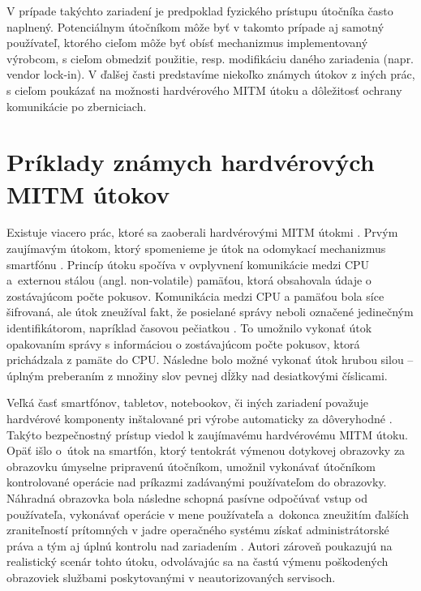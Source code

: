 V prípade takýchto zariadení je predpoklad fyzického prístupu útočníka často naplnený. Potenciálnym útočníkom môže byť v takomto prípade aj samotný používateľ, ktorého cieľom môže byť obísť mechanizmus implementovaný výrobcom, s cieľom obmedziť použitie, resp. modifikáciu daného zariadenia (napr. vendor lock-in). V ďalšej časti predstavíme niekoľko známych útokov z iných prác, s cieľom poukázať na možnosti hardvérového MITM útoku a dôležitosť ochrany komunikácie po zberniciach.

\section{Príklady známych hardvérových MITM útokov}
Existuje viacero prác, ktoré sa zaoberali hardvérovými MITM útokmi \cite{mitmI2C, mitmSmartphone, mitmBitlocker, mitmTouch, mitmTPM}. Prvým zaujímavým útokom, ktorý spomenieme je útok na odomykací mechanizmus smartfónu \cite{mitmSmartphone}. Princíp útoku spočíva v ovplyvnení komunikácie medzi CPU a~externou stálou (angl. non-volatile) pamäťou, ktorá obsahovala údaje o zostávajúcom počte pokusov. Komunikácia medzi CPU a pamäťou bola síce šifrovaná, ale útok zneužíval fakt, že posielané správy neboli označené jedinečným identifikátorom, napríklad časovou pečiatkou \cite{mitmSmartphone}. To umožnilo vykonať útok opakovaním správy s informáciou o zostávajúcom počte pokusov, ktorá prichádzala z pamäte do CPU. Následne bolo možné vykonať útok hrubou silou -- úplným preberaním z množiny slov pevnej dĺžky nad desiatkovými číslicami.

Veľká časť smartfónov, tabletov, notebookov, či iných zariadení považuje hardvérové komponenty inštalované pri výrobe automaticky za dôveryhodné \cite{mitmTouch}. Takýto bezpečnostný prístup viedol k zaujímavému hardvérovému MITM útoku. Opäť išlo o~útok na smartfón, ktorý tentokrát výmenou dotykovej obrazovky za obrazovku úmyselne pripravenú útočníkom, umožnil vykonávať útočníkom kontrolované operácie nad príkazmi zadávanými používateľom do obrazovky. Náhradná obrazovka bola následne schopná pasívne odpočúvať vstup od používateľa, vykonávať operácie v mene používateľa a~dokonca zneužitím ďalších zraniteľností prítomných v jadre operačného systému získať administrátorské práva a tým aj úplnú kontrolu nad zariadením \cite{mitmTouch}. Autori zároveň poukazujú na realistický scenár tohto útoku, odvolávajúc sa na častú výmenu poškodených obrazoviek službami poskytovanými v neautorizovaných servisoch.

